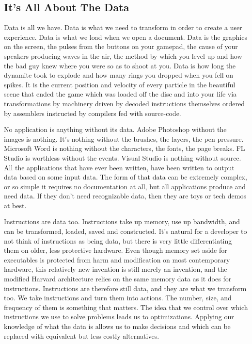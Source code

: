 \documentclass[a4paper,12pt]{book}
\begin{document}
\subsection{It's All About The Data}

Data is all we have.
Data is what we need to transform in order to create a user experience.
Data is what we load when we open a document.
Data is the graphics on the screen, the pulses from the buttons on your gamepad, the cause of your speakers producing waves in the air, the method by which you level up and how the bad guy knew where you were so as to shoot at you.
Data is how long the dynamite took to explode and how many rings you dropped when you fell on spikes.
It is the current position and velocity of every particle in the beautiful scene that ended the game which was loaded off the disc and into your life via transformations by machinery driven by decoded instructions themselves ordered by assemblers instructed by compilers fed with source-code.

No application is anything without its data.
Adobe Photoshop without the images is nothing.
It's nothing without the brushes, the layers, the pen pressure.
Microsoft Word is nothing without the characters, the fonts, the page breaks.
FL Studio is worthless without the events.
Visual Studio is nothing without source.
All the applications that have ever been written, have been written to output data based on some input data.
The form of that data can be extremely complex, or so simple it requires no documentation at all, but all applications produce and need data.
If they don't need recognizable data, then they are toys or tech demos at best.

Instructions are data too.
Instructions take up memory, use up bandwidth, and can be transformed, loaded, saved and constructed.
It's natural for a developer to not think of instructions as being data, but there is very little differentiating them on older, less protective hardware.
Even though memory set aside for executables is protected from harm and modification on most contemporary hardware, this relatively new invention is still merely an invention, and the modified Harvard architecture relies on the same memory data as it does for instructions.
Instructions are therefore still data, and they are what we transform too.
We take instructions and turn them into actions.
The number, size, and frequency of them is something that matters.
The idea that we control over which instructions we use to solve problems leads us to optimizations.
Applying our knowledge of what the data is allows us to make decisions and which can be replaced with equivalent but less costly alternatives.
\end{document}
